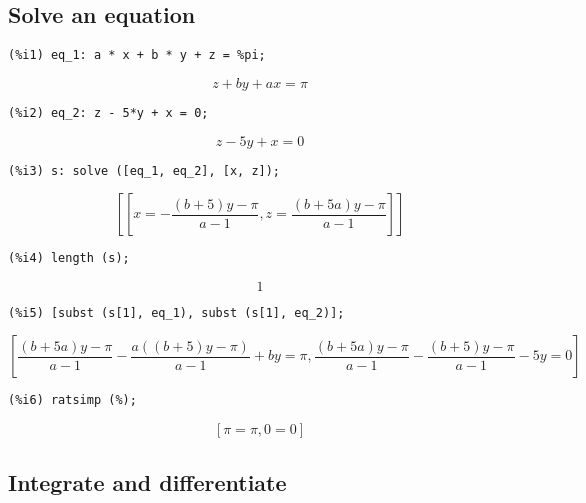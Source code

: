 \documentclass[12pt,leqno]{article}
\begin{document}
\subsection{Solve an equation}
\begin{verbatim}
(%i1) eq_1: a * x + b * y + z = %pi;
\end{verbatim}
\begin{dmath}[number={\(\mathop{\mathrm{\%o}_{1}}\)}]
z+b y+a x = \pi
\end{dmath}
\begin{verbatim}
(%i2) eq_2: z - 5*y + x = 0;
\end{verbatim}
\begin{dmath}[number={\(\mathop{\mathrm{\%o}_{2}}\)}]
z-5 y+x = 0
\end{dmath}
\begin{verbatim}
(%i3) s: solve ([eq_1, eq_2], [x, z]);
\end{verbatim}
\begin{dmath}[number={\(\mathop{\mathrm{\%o}_{3}}\)}]
\left[\left[x = -\frac{\left(b+5\right) y-\pi}{a-1}, z = \frac{\left(b+5 a\right) y-\pi}{a-1}\right]\right]
\end{dmath}
\begin{verbatim}
(%i4) length (s);
\end{verbatim}
\begin{dmath}[number={\(\mathop{\mathrm{\%o}_{4}}\)}]
1
\end{dmath}
\begin{verbatim}
(%i5) [subst (s[1], eq_1), subst (s[1], eq_2)];
\end{verbatim}
\begin{dmath}[number={\(\mathop{\mathrm{\%o}_{5}}\)}]
\left[\frac{\left(b+5 a\right) y-\pi}{a-1}-\frac{a \left(\left(b+5\right) y-\pi\right)}{a-1}+b y = \pi, \frac{\left(b+5 a\right) y-\pi}{a-1}-\frac{\left(b+5\right) y-\pi}{a-1}-5 y = 0\right]
\end{dmath}
\begin{verbatim}
(%i6) ratsimp (%);
\end{verbatim}
\begin{dmath}[number={\(\mathop{\mathrm{\%o}_{6}}\)}]
\left[\pi = \pi, 0 = 0\right]
\end{dmath}


\subsection{Integrate and differentiate}
\end{document}
